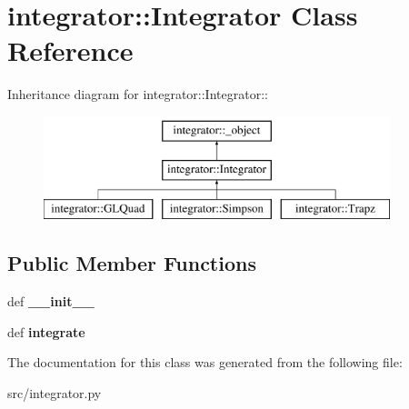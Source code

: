\hypertarget{classintegrator_1_1Integrator}{
\section{integrator::Integrator Class Reference}
\label{dc/da1/classintegrator_1_1Integrator}
}
Inheritance diagram for integrator::Integrator::\begin{figure}[H]
\begin{center}
\leavevmode
\includegraphics[height=3cm]{dc/da1/classintegrator_1_1Integrator}
\end{center}
\end{figure}
\subsection*{Public Member Functions}
\begin{DoxyCompactItemize}
\item 
\hypertarget{classintegrator_1_1Integrator_a973f474b13cde1d131d4a187b6b9f498}{
def {\bfseries \_\-\_\-init\_\-\_\-}}
\label{dc/da1/classintegrator_1_1Integrator_a973f474b13cde1d131d4a187b6b9f498}

\item 
\hypertarget{classintegrator_1_1Integrator_a7ab4e9c4f500e5c1020508e160237e0e}{
def {\bfseries integrate}}
\label{dc/da1/classintegrator_1_1Integrator_a7ab4e9c4f500e5c1020508e160237e0e}

\end{DoxyCompactItemize}


The documentation for this class was generated from the following file:\begin{DoxyCompactItemize}
\item 
src/integrator.py\end{DoxyCompactItemize}
